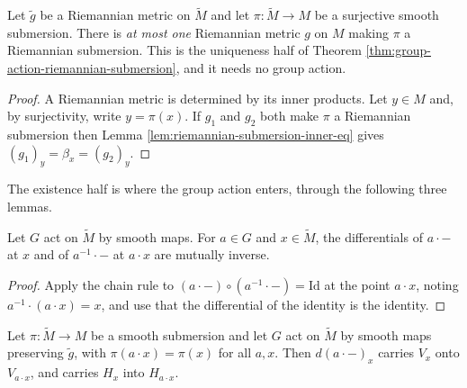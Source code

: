 \begin{proposition}
\label{prop:riemannian-submersion-metric-unique}
\leanok
{}
Let $\tilde{g}$ be a Riemannian metric on $\tilde{M}$ and let $\pi : \tilde{M} \to M$ be a surjective smooth submersion. There is \emph{at most one} Riemannian metric $g$ on $M$ making $\pi$ a Riemannian submersion. This is the uniqueness half of Theorem \ref{thm:group-action-riemannian-submersion}, and it needs no group action.
\end{proposition}

\begin{proof}
\leanok
{}
A Riemannian metric is determined by its inner products. Let $y \in M$ and, by surjectivity, write $y = \pi(x)$. If $g_1$ and $g_2$ both make $\pi$ a Riemannian submersion then Lemma \ref{lem:riemannian-submersion-inner-eq} gives $(g_1)_y = \beta_x = (g_2)_y$.
\end{proof}

\noindent The existence half is where the group action enters, through the following three lemmas.

\begin{lemma}
\label{lem:mfderiv-smul-inv-smul}
\leanok
{}
Let $G$ act on $\tilde{M}$ by smooth maps. For $a \in G$ and $x \in \tilde{M}$, the differentials of $a \cdot {-}$ at $x$ and of $a^{-1} \cdot {-}$ at $a \cdot x$ are mutually inverse.
\end{lemma}

\begin{proof}
\leanok
Apply the chain rule to $(a \cdot {-}) \circ (a^{-1} \cdot {-}) = \mathrm{Id}$ at the point $a \cdot x$, noting $a^{-1} \cdot (a \cdot x) = x$, and use that the differential of the identity is the identity.
\end{proof}

\begin{lemma}
\label{lem:horizontal-space-smul}
\leanok
{}
Let $\pi : \tilde{M} \to M$ be a smooth submersion and let $G$ act on $\tilde{M}$ by smooth maps preserving $\tilde{g}$, with $\pi(a \cdot x) = \pi(x)$ for all $a, x$. Then $d(a \cdot {-})_x$ carries $V_x$ onto $V_{a \cdot x}$, and carries $H_x$ into $H_{a \cdot x}$.
\end{lemma}

